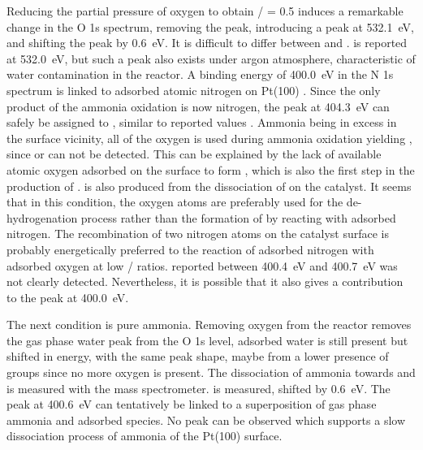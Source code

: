 Reducing the partial pressure of oxygen to obtain / = 0.5 induces a remarkable change in the O 1s spectrum, removing the  peak, introducing a  peak at \qty{532.1}{\eV}, and shifting the  peak by \qty{0.6}{\eV}.
It is difficult to differ between  and .
 is reported at \qty{532.0}{\eV}, but such a peak also exists under argon atmosphere, characteristic of water contamination in the reactor.
A binding energy of \qty{400.0}{\eV} in the N 1s spectrum is linked to adsorbed atomic nitrogen on Pt(100) \parencite{Sugai1993, vandenBroek1999}.
Since the only product of the ammonia oxidation is now nitrogen, the peak at \qty{404.3}{\eV} can safely be assigned to , similar to reported values \parencite{Ivashenko2021}.
Ammonia being in excess in the surface vicinity, all of the oxygen is used during ammonia oxidation yielding , since  or  can not be detected.
This can be explained by the lack of available atomic oxygen adsorbed on the surface to form , which is also the first step in the production of .
 is also produced from the dissociation of  on the catalyst.
It seems that in this condition, the oxygen atoms are preferably used for the de-hydrogenation process rather than the formation of  by reacting with adsorbed nitrogen.
The recombination of two nitrogen atoms on the catalyst surface is probably energetically preferred to the reaction of adsorbed nitrogen with adsorbed oxygen at low / ratios.
 reported between \qty{400.4}{\eV} and \qty{400.7}{\eV} \parencite{Ivashenko2021} was not clearly detected.
Nevertheless, it is possible that it also gives a contribution to the peak at \qty{400.0}{\eV}.

The next condition is pure ammonia.
Removing oxygen from the reactor removes the gas phase water peak from the O 1s level, adsorbed water is still present but shifted in energy, with the same peak shape, maybe from a lower presence of  groups since no more oxygen is present.
The dissociation of ammonia towards  and  is measured with the mass spectrometer.
 is measured, shifted by \qty{0.6}{\eV}.
The peak at \qty{400.6}{\eV} can tentatively be linked to a superposition of gas phase ammonia and adsorbed  species.
No  peak can be observed which supports a slow dissociation process of ammonia of the Pt(100) surface.

